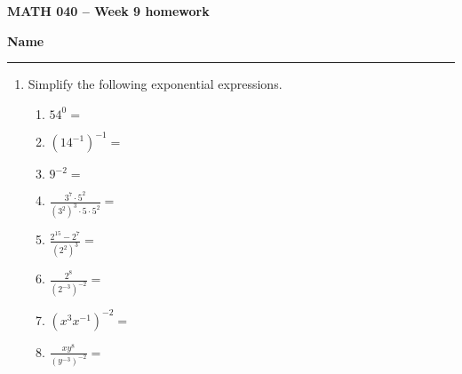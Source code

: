 \documentclass[12 pt]{article}
\begin{document}
  \begin{center}
    \textbf{\hfill MATH 040 -- Week 9 homework} \\
  \end{center}
  \medskip

  \noindent
  \textbf{Name}\ \rule{3.5in}{.4pt} \hfill
  \vspace{.1in}
  \hspace*{0.2in}

	\medskip
  \noindent

  \begin{enumerate}
    \item Simplify the following exponential expressions.
    \begin{enumerate}
      \item $54^0 = $
      \\
      \item $(14^{-1})^{-1} = $
      \\
      \item $9^{-2} = $
      \\ \vspace{1.5cm}
      \item $\displaystyle\frac{3^7\cdot5^2}{(3^2)^3 \cdot 5 \cdot 5^2} = $
      \\ \vspace{1.5cm}
      \item $\displaystyle \frac{2^15 - 2^7}{(2^2)^3} = $
      \\ \vspace{1.5cm}
      \item $\displaystyle\frac{2^8}{(2^{-3})^{-2}} = $
      \\ \vspace{1.5cm}
      \item $(x^3x^{-1})^{-2} = $\\ \vspace{1.5cm}
      \item $\displaystyle\frac{xy^8}{(y^{-3})^{-2}} = $
      \\ \vspace{1.5cm}

\end{enumerate}
\end{enumerate}
\end{document}
